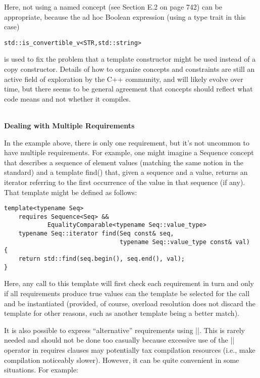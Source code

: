 Here, not using a named concept (see Section E.2 on page 742) can be appropriate, because the ad hoc Boolean expression (using a type trait in this case)

\begin{lstlisting}[style=styleCXX]
std::is_convertible_v<STR,std::string>
\end{lstlisting}

is used to fix the problem that a template constructor might be used instead of a copy constructor. Details of how to organize concepts and constraints are still an active field of exploration by the C++ community, and will likely evolve over time, but there seems to be general agreement that concepts should reflect what code means and not whether it compiles.

\hspace*{\fill} \\ %
\noindent
\textbf{Dealing with Multiple Requirements}

In the example above, there is only one requirement, but it’s not uncommon to have multiple requirements. For example, one might imagine a Sequence concept that describes a sequence of element values (matching the same notion in the standard) and a template find() that, given a sequence and a value, returns an iterator referring to the first occurrence of the value in that sequence (if any). That template might be defined as follows:

\begin{lstlisting}[style=styleCXX]
template<typename Seq>
	requires Sequence<Seq> &&
			EqualityComparable<typename Seq::value_type>
	typename Seq::iterator find(Seq const& seq,
								typename Seq::value_type const& val)
{
	return std::find(seq.begin(), seq.end(), val);
}
\end{lstlisting}

Here, any call to this template will first check each requirement in turn and only if all requirements produce true values can the template be selected for the call and be instantiated (provided, of course, overload resolution does not discard the template for other reasons, such as another template being a better match).

It is also possible to express “alternative” requirements using ||. This is rarely needed and should not be done too casually because excessive use of the || operator in requires clauses may potentially tax compilation resources (i.e., make compilation noticeably slower). However, it can be quite convenient in some situations. For example:

